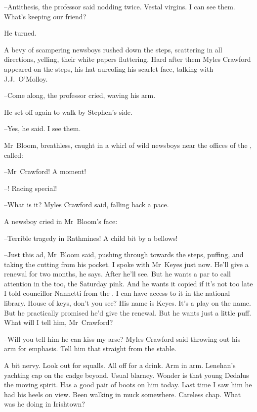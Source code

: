 --Antithesis,
the professor said nodding twice.
Vestal virgins.
I can see them.
What's keeping our friend?

He turned.

A bevy of scampering newsboys rushed down the steps,
scattering in all directions, yelling,
their white papers fluttering.
Hard after them Myles Crawford appeared on the steps,
his hat aureoling his scarlet face,
talking with J.J.~O'Molloy.

--Come along,
the professor cried,
waving his arm.

He set off again to walk by Stephen's side.



--Yes,
he said.
I see them.

Mr~Bloom,
breathless,
caught in a whirl of wild newsboys
near the offices of the ,
called:

--Mr~Crawford!
A moment!

--!
Racing special!

--What is it?
Myles Crawford said,
falling back a pace.

A newsboy cried in Mr~Bloom's face:

--Terrible tragedy in Rathmines!
A child bit by a bellows!



--Just this ad,
Mr~Bloom said,
pushing through towards the steps,
puffing,
and taking the cutting from his pocket.
I spoke with Mr~Keyes just now.
He'll give a renewal for two months, he says.
After he'll see.
But he wants a par to call attention in the  too,
the Saturday pink.
And he wants it copied if it's not too late
I told councillor Nannetti from the .
I can have access to it in the national library.
House of keys, don't you see?
His name is Keyes.
It's a play on the name.
But he practically promised he'd give the renewal.
But he wants
just a little puff.
What will I tell him, Mr~Crawford?



--Will you tell him he can kiss my arse?
Myles Crawford said
throwing out his arm for emphasis.
Tell him that straight from the stable.

A bit nervy.
Look out for squalls.
All off for a drink.
Arm in arm.
Lenehan's yachting cap on the cadge beyond.
Usual blarney.
Wonder is that young Dedalus the moving spirit.
Has a good pair of boots on him today.
Last time I saw him he had his heels on view.
Been walking in muck somewhere.
Careless chap.
What was he doing in Irishtown?

